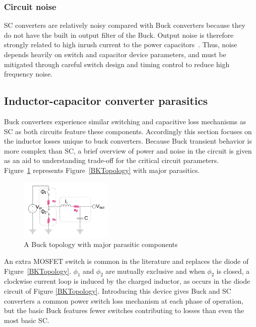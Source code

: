 \documentclass[letterpaper,twocolumn,10pt]{article}
\begin{document}
\subsubsection{Circuit noise }
SC converters are relatively noisy compared with Buck converters because they do not have the built in output filter of the Buck. Output noise is therefore strongly related to %
high inrush current to the power capacitors~\cite{Zheng2013}. Thus, noise depends heavily on switch and capacitor device parameters, and must be mitigated through careful switch design and timing control to reduce high frequency noise. 

\subsection{Inductor-capacitor converter parasitics}

Buck converters experience similar switching and capacitive loss mechanisms as SC as both circuits feature these components. Accordingly this section focuses on the inductor losses unique to buck converters. Because Buck transient behavior is more complex than SC, a brief overview of power and noise in the circuit is given as an aid to understanding trade-off for the critical circuit parameters.\\
Figure~\ref{NonIdealBuckTopology} represents Figure~\ref{BKTopology} with major parasitics.\\
\begin{figure}[here]
\includegraphics[width=0.4\textwidth]{BuckTopologyParasitics}
\caption{A Buck topology with major parasitic components}
\label{NonIdealBuckTopology}
\end{figure}
An extra MOSFET switch is common in the literature and replaces the diode of Figure~\ref{BKTopology}. $\phi_1$ and $\phi_2$ are mutually exclusive and when $\phi_2$ is closed, a clockwise current loop is induced by the charged inductor, as occurs in the diode circuit of Figure \ref{BKTopology}. Introducing this device gives Buck and SC converters a common power switch loss mechanism at each phase of operation, but the basic Buck features fewer switches contributing to losses than even the most basic SC.\\
\end{document}
